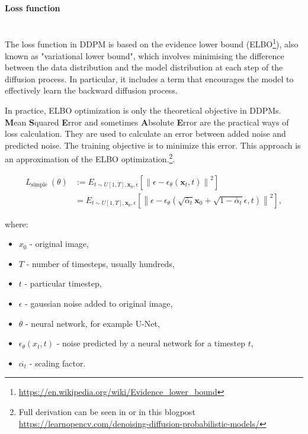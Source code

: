 \paragraph{Loss function}\mbox{}\\
\indent The loss function in DDPM is based on the evidence lower bound (ELBO\footnote{\url{https://en.wikipedia.org/wiki/Evidence_lower_bound}}), also known as "variational lower bound", which involves minimising the difference between the data distribution and the model distribution at each step of the diffusion process. In particular, it includes a term that encourages the model to effectively learn the backward diffusion process.

In practice, ELBO optimization is only the theoretical objective in DDPMs.
\textbf{M}ean \textbf{S}quared \textbf{E}rror and sometimes \textbf{A}bsolute \textbf{E}rror are the practical ways of loss calculation. They are used to calculate an error between added noise and predicted noise. The training objective is to minimize this error. This approach is an approximation of the ELBO optimization.\footnote{Full derivation can be seen in \cite{ho2020denoisingdiffusionprobabilisticmodels} or in this blogpost \url{https://learnopencv.com/denoising-diffusion-probabilistic-models/}}. 


\begin{equation}
\begin{aligned} L_{\text {simple }}(\theta) & :=E_{t \sim U[1, T], \mathbf{x}_0, \epsilon}\left[\left\|\epsilon-\epsilon_\theta\left(\mathbf{x}_t, t\right)\right\|^2\right] \\ & =E_{t \sim U[1, T], \mathbf{x}_0, \epsilon}\left[\left\|\epsilon-\epsilon_\theta\left(\sqrt{\bar{\alpha}_t} \mathbf{x}_0+\sqrt{1-\bar{\alpha}_t} \epsilon, t\right)\right\|^2\right],
\end{aligned}
\end{equation}

where:
\begin{itemize}
    \item $x_0$ - original image,
    \item $T$ - number of timesteps, usually hundreds,
    \item $t$ - particular timestep,
    \item $\epsilon$ - gaussian noise added to original image,
    \item $\theta$ - neural network, for example U-Net,
    \item $\epsilon_\theta(x_t, t)$ - noise predicted by a neural network for a timestep $t$,
    \item $\overline{\alpha_t}$ - scaling factor.
\end{itemize}

